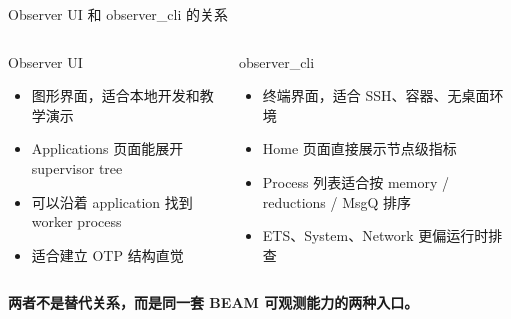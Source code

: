 \documentclass[aspectratio=169, 9pt]{beamer}
\newcommand{\good}[1]{\textbf{\color{accent!80!black}#1}}
\begin{document}
\begin{frame}{Observer UI 和 observer\_cli 的关系}
  \begin{columns}[T,onlytextwidth]
    \begin{block}{Observer UI}
      \begin{itemize}
        \item 图形界面，适合本地开发和教学演示
        \item Applications 页面能展开 supervisor tree
        \item 可以沿着 application 找到 worker process
        \item 适合建立 OTP 结构直觉
      \end{itemize}
    \end{block}
    \begin{exampleblock}{observer\_cli}
      \begin{itemize}
        \item 终端界面，适合 SSH、容器、无桌面环境
        \item Home 页面直接展示节点级指标
        \item Process 列表适合按 memory / reductions / MsgQ 排序
        \item ETS、System、Network 更偏运行时排查
      \end{itemize}
    \end{exampleblock}
  \end{columns}
  \vspace{0.25cm}
  \centering
  \good{两者不是替代关系，而是同一套 BEAM 可观测能力的两种入口。}
\end{frame}
\end{document}
